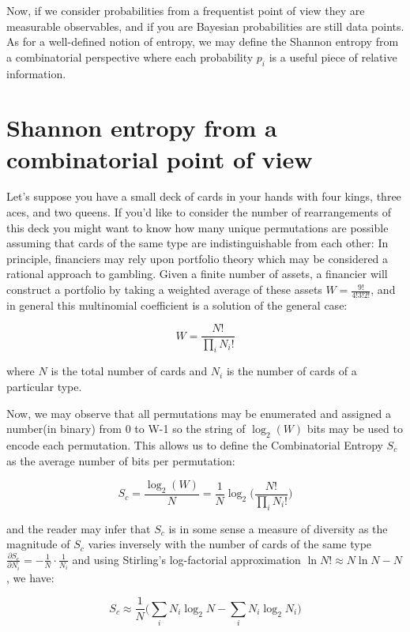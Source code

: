 \documentclass{article}
\begin{document}
Now, if we consider probabilities from a frequentist point of view they are measurable observables, and if you are Bayesian probabilities are still data points. As for a well-defined notion of entropy, we may define the Shannon entropy from a combinatorial perspective where each probability $p_i$ is a useful piece of relative information.

\section{Shannon entropy from a combinatorial point of view}

Let’s suppose you have a small deck of cards in your hands with four kings, three aces, and two queens. If you’d like to consider the number of rearrangements of this deck you might want to know how many unique permutations are possible assuming that cards of the same type are indistinguishable from each other:
In principle, financiers may rely upon portfolio theory which may be considered a rational approach to gambling. Given a finite number of assets, a financier will construct a portfolio by taking a weighted average of these assets $W = \frac{9!}{4!3!2!}$, and in general this multinomial coefficient is a solution of the general case: 

\begin{equation}
W = \frac{N!	}{\prod_i N_i!}
\end{equation}

where $N$ is the total number of cards and $N_i$ is the number of cards of a particular type.

Now, we may observe that all permutations may be enumerated and assigned a number(in binary) from 0 to W-1
so the string of $\log_2(W)$ bits may be used to encode each permutation. This allows us to define the
Combinatorial Entropy $S_c$ as the average number of bits per permutation:

\begin{equation}
S_c = \frac{\log_2(W)}{N} = \frac{1}{N} \log_2 \big(\frac{N!}{\prod_i N_i!}\big)
\end{equation}

and the reader may infer that $S_c$ is in some sense a measure of diversity as the magnitude of $S_c$ varies inversely with the number of cards of the same type $\frac{\partial S_c}{\partial N_i} = -\frac{1}{N} \cdot \frac{1}{N_i}$ and using Stirling's log-factorial approximation $\ln N! \approx N \ln N - N$, we have:

\begin{equation}
S_c \approx \frac{1}{N} \big(\sum_i N_i \log_2 N - \sum_i N_i \log_2 N_i \big)
\end{equation}
\end{document}
